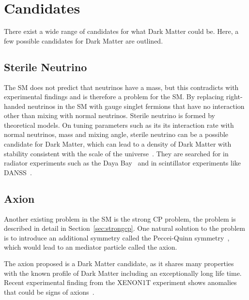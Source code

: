 \section{Candidates}
\label{section:candidates}
There exist a wide range of candidates for what Dark Matter could be. Here, a few possible candidates for Dark Matter are outlined.

\subsection{Sterile Neutrino}
The SM does not predict that neutrinos have a mass, but this contradicts with experimental findings and is therefore a problem for the SM. By replacing right-handed neutrinos in the SM with gauge singlet fermions that have no interaction other than mixing with normal neutrinos. Sterile neutrino is formed by theoretical models. On tuning parameters such as its its interaction rate with normal neutrinos, mass and mixing angle, sterile neutrino can be a possible candidate for Dark
Matter, which can lead to a density of Dark Matter with stability consistent with the scale of the universe~\cite{dodelson1994sterile}. They are searched for in radiator experiments such as the Daya Bay~\cite{an2014search, wong2017search} and in scintillator experiments like DANSS~\cite{alekseev2018search}.

\subsection{Axion}

Another existing problem in the SM is the strong CP problem, the problem is described in detail in Section~\ref{sec:strongcp}. One natural solution to the problem is to introduce an additional symmetry called the Peccei-Quinn symmetry~\cite{peccei1977cp}, which would lead to an mediator particle called the axion. 

The axion proposed is a Dark Matter candidate, as it shares many properties with the known profile of Dark Matter including an exceptionally long life time. Recent experimental finding from the XENON1T experiment shows anomalies that could be signs of axions~\cite{aprile2020excess}.


